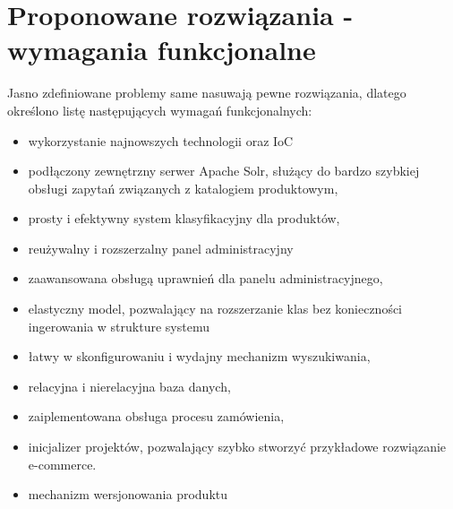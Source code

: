 \section{Proponowane rozwiązania - wymagania funkcjonalne}
Jasno zdefiniowane problemy same nasuwają pewne rozwiązania, dlatego określono listę następujących wymagań funkcjonalnych:
\begin{itemize}
	\item wykorzystanie najnowszych technologii oraz IoC
	\item podłączony zewnętrzny serwer Apache Solr, służący do bardzo szybkiej obsługi zapytań związanych z katalogiem produktowym,
	\item prosty i efektywny system klasyfikacyjny dla produktów,
	\item reużywalny i rozszerzalny panel administracyjny 
	\item zaawansowana obsługą uprawnień dla panelu administracyjnego,
	\item elastyczny model, pozwalający na rozszerzanie klas bez konieczności ingerowania w strukture systemu
	\item łatwy w skonfigurowaniu i wydajny mechanizm wyszukiwania,
	\item relacyjna i nierelacyjna baza danych,
	\item zaiplementowana obsługa procesu zamówienia,
	\item inicjalizer projektów, pozwalający szybko stworzyć przykładowe rozwiązanie e-commerce.
	\item mechanizm wersjonowania produktu
\end{itemize} 

